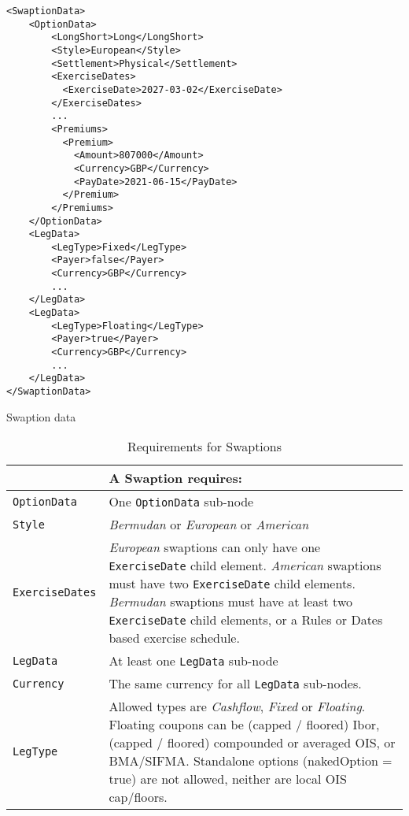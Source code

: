 \begin{listing}[H]
\begin{verbatim}
<SwaptionData>
    <OptionData>
        <LongShort>Long</LongShort>
        <Style>European</Style>
        <Settlement>Physical</Settlement>
        <ExerciseDates>
          <ExerciseDate>2027-03-02</ExerciseDate>
        </ExerciseDates>
        ...
        <Premiums>
          <Premium>
            <Amount>807000</Amount>
            <Currency>GBP</Currency>
            <PayDate>2021-06-15</PayDate>
          </Premium>
        </Premiums>
    </OptionData>
    <LegData>
        <LegType>Fixed</LegType>
        <Payer>false</Payer>    
        <Currency>GBP</Currency>
        ...
    </LegData>
    <LegData>
        <LegType>Floating</LegType>
        <Payer>true</Payer>     
        <Currency>GBP</Currency>
        ...
    </LegData>
</SwaptionData>
\end{verbatim}
\caption{Swaption data}
\label{lst:swaption_data}
\end{listing}

\begin{table}[H]
\centering
\begin{tabular} {|l|p{10cm}|}
    \hline
        & \bfseries{A  Swaption requires:} \\  \hline
    \lstinline!OptionData! & One \lstinline!OptionData! sub-node  \\  \hline
    \lstinline!Style! &  \emph{Bermudan} or \emph{European} or \emph{American}\\ \hline
    \lstinline!ExerciseDates! & \emph{European} swaptions can only have one \lstinline!ExerciseDate! child element. \emph{American} swaptions must have two \lstinline!ExerciseDate! child elements. \emph{Bermudan} swaptions must have at least two \lstinline!ExerciseDate! child elements, or a Rules or Dates based exercise schedule. \\ \hline
    \lstinline!LegData! &  At least one \lstinline!LegData! sub-node \\ \hline
    \lstinline!Currency! & The same currency for all \lstinline!LegData! sub-nodes.\\ \hline
    \lstinline!LegType! & Allowed types are \emph{Cashflow}, \emph{Fixed} or \emph{Floating}. Floating coupons can be (capped / floored) Ibor, (capped / floored) compounded or averaged OIS, or BMA/SIFMA. Standalone options (nakedOption = true) are not allowed, neither are local OIS cap/floors. \\ \hline
  \end{tabular}
  \caption{Requirements for Swaptions}
  \label{tab:swaption_requirements}
\end{table}

